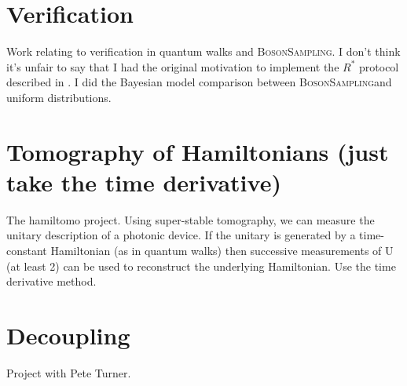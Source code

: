 \documentclass[11pt,a4paper,twoside]{report}
\newcommand{\bosonsampling}{\textsc{BosonSampling}}
\newcommand{\rstar}{R^{*}}
\newcommand{\mat}[1]{\mathrm{#1}}
\begin{document}
\chapter{Verification}
\label{ch:Verification}

Work relating to verification in quantum walks and \bosonsampling. I don't think
it's unfair to say that I had the original motivation to implement the
\(\rstar\) protocol described in \cite{aaronson13}. I did the Bayesian model
comparison between \bosonsampling and uniform distributions.

\chapter{Tomography of Hamiltonians (just take the time derivative)}
\label{ch:Hamiltomo}
The hamiltomo project. Using super-stable tomography, we can measure the unitary
description of a photonic device. If the unitary is generated by a time-constant
Hamiltonian (as in quantum walks) then successive measurements of \(\mat{U}\)
(at least 2) can be used to reconstruct the underlying Hamiltonian. Use the time
derivative method.

\chapter{Decoupling}
\label{ch:Decoupling}

Project with Pete Turner.



\end{document}
